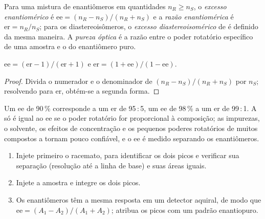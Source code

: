\begin{definition}\label{def:b3:asymmetric-synthesis:ee}
Para uma mistura de enantiômeros em quantidades $n_R \ge n_S$, o \emph{excesso
enantiomérico} é $\mathrm{ee} = (n_R - n_S)/(n_R + n_S)$ e a \emph{razão enantiomérica}%
 é $\mathrm{er} = n_R/n_S$; para os diastereoisômeros, o
\emph{excesso diastereoisomérico} de é definido da
mesma maneira. A \emph{pureza óptica} é a razão entre o
poder rotatório específico de uma amostra e o do enantiômero puro.
\end{definition}

\begin{proposition}[ee e er]\label{prop:b3:asymmetric-synthesis:ee-er}
$\mathrm{ee} = (\mathrm{er} - 1)/(\mathrm{er} + 1)$ e $\mathrm{er} = (1 + \mathrm{ee})/(1 - \mathrm{ee})$.
\end{proposition}

\begin{proof}
Divida o numerador e o denominador de $(n_R - n_S)/(n_R + n_S)$ por $n_S$; resolvendo para er, obtém-se a
segunda forma.
\end{proof}

Um ee de 90\,\% corresponde a um er de 95\,:\,5, um ee de 98\,\% a um er de 99\,:\,1. A 
só é igual ao ee se o poder rotatório for proporcional à composição; as impurezas, o
solvente, os efeitos de concentração e os pequenos poderes rotatórios de muitos compostos a tornam
pouco confiável, e o ee é medido separando os enantiômeros.

\begin{method}\label{met:b3:asymmetric-synthesis:ee-chromatogram}
\begin{enumerate}
  \item Injete primeiro o racemato, para identificar os dois picos e verificar sua
        separação (resolução até a linha de base) e suas áreas iguais.
  \item Injete a amostra e integre os dois picos.
  \item Os enantiômeros têm a mesma resposta em um detector aquiral, de modo que
        $\mathrm{ee} = (A_1 - A_2)/(A_1 + A_2)$; atribua os picos com um padrão enantiopuro.
\end{enumerate}
\end{method}

